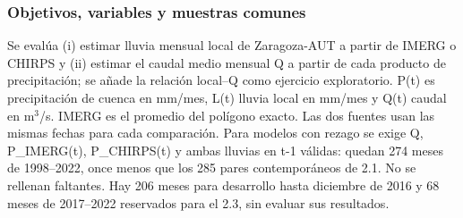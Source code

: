 \documentclass[10pt,a4paper]{article}
\begin{document}
\subsubsection*{Objetivos, variables y muestras comunes}
Se evalúa (i) estimar lluvia mensual local de Zaragoza-AUT a partir de IMERG o CHIRPS y (ii) estimar el caudal medio mensual Q a partir de cada producto de precipitación; se añade la relación local--Q como ejercicio exploratorio. P(t) es precipitación de cuenca en mm/mes, L(t) lluvia local en mm/mes y Q(t) caudal en m$^3$/s. IMERG es el promedio del polígono exacto. Las dos fuentes usan las mismas fechas para cada comparación. Para modelos con rezago se exige Q, P\_IMERG(t), P\_CHIRPS(t) y ambas lluvias en t-1 válidas: quedan 274 meses de 1998--2022, once menos que los 285 pares contemporáneos de 2.1. No se rellenan faltantes. Hay 206 meses para desarrollo hasta diciembre de 2016 y 68 meses de 2017--2022 reservados para el 2.3, sin evaluar sus resultados.
\end{document}
